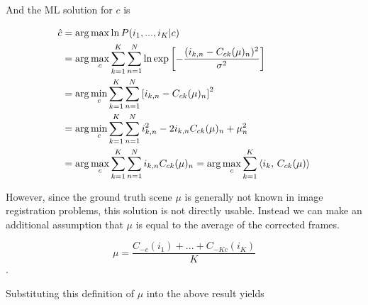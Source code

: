\documentclass[tocnosub,noragright,centerchapter,12pt]{uiucecethesis09}
\begin{document}
And the ML solution for $c$ is

\begin{align*}
  \hat{c} &= \arg \max \ln P(i_1, ..., i_K | c) \\
  &= \arg \max_c \sum_{k=1}^K \sum_{n=1}^N \ln \text{exp} \left[- \frac{(i_{k,n} - C_{ck}(\mu)_n)^2}{\sigma^2} \right] \\
  &= \arg \min_c \sum_{k=1}^K \sum_{n=1}^N \left[ i_{k,n} - C_{ck}(\mu)_n \right]^2 \\
  &= \arg \min_c \sum_{k=1}^K \sum_{n=1}^N i_{k,n}^2 - 2i_{k,n}C_{ck}(\mu)_n + \mu_n^2 \\
  &= \arg \max_c \sum_{k=1}^K \sum_{n=1}^N i_{k,n}C_{ck}(\mu)_n 
  = \arg \max_c \sum_{k=1}^K \left\langle i_k,\,C_{ck}(\mu) \right\rangle
\end{align*}

However, since the ground truth scene $\mu$ is generally not known in image registration problems, this solution is not directly usable.  Instead we can make an additional assumption that $\mu$ is equal to the average of the corrected frames.

$$\mu = \frac{C_{-c}(i_1) + ... + C_{-Kc}(i_K)}{K}$$.

Substituting this definition of $\mu$ into the above result yields
\end{document}
